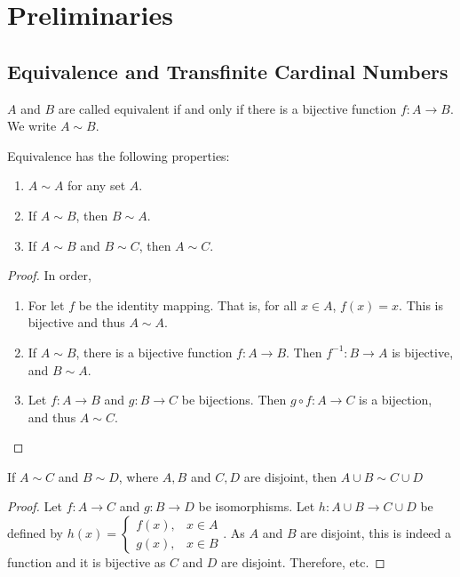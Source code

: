 \documentclass[crop=false,class=article,oneside]{standalone}
\begin{document}
    \ifx\ifsub\undefined
        \section*{Preliminaries}
        \setcounter{section}{1}
    \fi
    \subsection{Equivalence and Transfinite Cardinal Numbers}
        \begin{definition}
        $A$ and $B$ are called equivalent if and only if there is a bijective function $f:A\rightarrow B$. We write $A\sim B$.
        \end{definition}
        \begin{theorem}
        Equivalence has the following properties:
        \begin{enumerate}
        \item $A\sim A$ for any set $A$.
        \item If $A\sim B$, then $B\sim A$.
        \item If $A\sim B$ and $B\sim C$, then $A\sim C$.
        \end{enumerate}
        \end{theorem}
        \begin{proof}
        In order,
        \begin{enumerate}
        \item For let $f$ be the identity mapping. That is, for all $x\in A$, $f(x) = x$. This is bijective and thus $A\sim A$.
        \item If $A\sim B$, there is a bijective function $f:A\rightarrow B$. Then $f^{-1}:B\rightarrow A$ is bijective, and $B\sim A$.
        \item Let $f:A\rightarrow B$ and $g:B\rightarrow C$ be bijections. Then $g\circ f:A\rightarrow C$ is a bijection, and thus $A\sim C$.
        \end{enumerate}
        \end{proof}
        \begin{theorem}
        If $A\sim C$ and $B\sim D$, where $A,B$ and $C,D$ are disjoint, then $A\cup B \sim C\cup D$
        \end{theorem}
        \begin{proof}
        Let $f:A\rightarrow C$ and $g:B\rightarrow D$ be isomorphisms. Let $h:A\cup B \rightarrow C\cup D$ be defined by $h(x) = \begin{cases} f(x), & x\in A\\ g(x), & x\in B\end{cases}$. As $A$ and $B$ are disjoint, this is indeed a function and it is bijective as $C$ and $D$ are disjoint. Therefore, etc.
        \end{proof}
\end{document}
